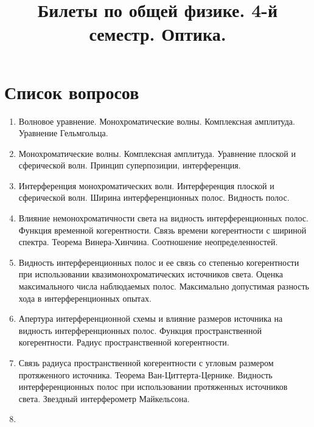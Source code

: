 \documentclass[a4paper, 12pt]{book}
\title{Билеты по общей физике. 4-й семестр. Оптика.}
\begin{document}
	\maketitle
	\newpage
	\tableofcontents
	\chapter{Список вопросов}
	\begin{enumerate}
		\item Волновое уравнение. Монохроматические волны. Комплексная амплитуда. Уравнение Гельмгольца.
		\item Монохроматические волны. Комплексная амплитуда. Уравнение плоской и сферической волн. Принцип суперпозиции, интерференция.
		\item Интерференция монохроматических волн. Интерференция плоской и сферической волн. Ширина интерференционных полос. Видность полос.
		\item Влияние немонохроматичности света на видность интерференционных полос. Функция временной когерентности. Связь времени когерентности с шириной спектра. Теорема Винера-Хинчина. Соотношение неопределенностей.
		\item Видность интерференционных полос и ее связь со степенью когерентности при использовании квазимонохроматических источников света. Оценка максимального числа наблюдаемых полос. Максимально допустимая разность хода в интерференционных опытах.
		\item Апертура интерференционной схемы и влияние размеров источника на видность интерференционных полос. Функция пространственной когерентности. Радиус пространственной когерентности.
		\item Связь радиуса пространственной когерентности с угловым размером протяженного источника. Теорема Ван-Циттерта-Цернике. Видность интерференционных полос при использовании протяженных источников света. Звездный интерферометр Майкельсона.
		\item 
	\end{enumerate}
\end{document}
